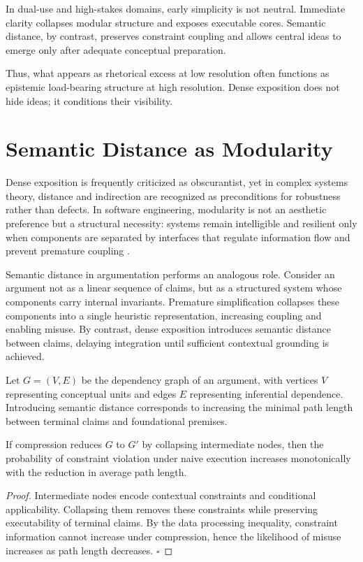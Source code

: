 In dual-use and high-stakes domains, early simplicity is not neutral. Immediate clarity collapses modular structure and exposes executable cores. Semantic distance, by contrast, preserves constraint coupling and allows central ideas to emerge only after adequate conceptual preparation.

Thus, what appears as rhetorical excess at low resolution often functions as epistemic load-bearing structure at high resolution. Dense exposition does not hide ideas; it conditions their visibility.

\section{Semantic Distance as Modularity}

Dense exposition is frequently criticized as obscurantist, yet in complex systems theory, distance and indirection are recognized as preconditions for robustness rather than defects. In software engineering, modularity is not an aesthetic preference but a structural necessity: systems remain intelligible and resilient only when components are separated by interfaces that regulate information flow and prevent premature coupling \cite{parnas1972,boehm1988}.

Semantic distance in argumentation performs an analogous role. Consider an argument not as a linear sequence of claims, but as a structured system whose components carry internal invariants. Premature simplification collapses these components into a single heuristic representation, increasing coupling and enabling misuse. By contrast, dense exposition introduces semantic distance between claims, delaying integration until sufficient contextual grounding is achieved.

\begin{lemma}
Let $G = (V,E)$ be the dependency graph of an argument, with vertices $V$ representing conceptual units and edges $E$ representing inferential dependence. Introducing semantic distance corresponds to increasing the minimal path length between terminal claims and foundational premises.

If compression reduces $G$ to $G'$ by collapsing intermediate nodes, then the probability of constraint violation under naive execution increases monotonically with the reduction in average path length.
\end{lemma}

\begin{proof}
Intermediate nodes encode contextual constraints and conditional applicability. Collapsing them removes these constraints while preserving executability of terminal claims. By the data processing inequality, constraint information cannot increase under compression, hence the likelihood of misuse increases as path length decreases. \hfill $\square$
\end{proof}

